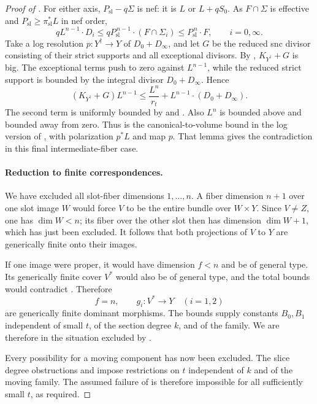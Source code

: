 \begin{proof}[Proof of ]
For either axis, \(P_{\mathrm{sl}}-q\Sigma\) is nef: it is \(L\)
or \(L+qS_0\). As \(F\cap\Sigma\) is effective and
\(P_{\mathrm{sl}}\ge\pi_{\mathrm{sl}}^*L\) in nef order,
\begin{equation}\label{eq:axis-degree-bound}
 qL^{n-1}\cdot D_i
 \le qP_{\mathrm{sl}}^{\,n-1}\cdot(F\cap\Sigma_i)
 \le P_{\mathrm{sl}}^{\,n}\cdot F,\qquad i=0,\infty .
\end{equation}
Take a log resolution \(p:Y^\dagger\to Y\) of \(D_0+D_\infty\),
and let \(G\) be the reduced snc divisor consisting of their strict
supports and all exceptional divisors. By
,
\(K_{Y^\dagger}+G\) is big. The exceptional terms push to zero
against \(L^{n-1}\), while the reduced strict support is bounded
by the integral divisor \(D_0+D_\infty\). Hence
\begin{equation}\label{eq:multisection-log-bound}
 (K_{Y^\dagger}+G)L^{n-1}
 \le \frac{L^n}{r_t}
       +L^{n-1}\cdot(D_0+D_\infty).
\end{equation}
The second term is uniformly bounded by
 and
. Also \(L^n\) is bounded above
and bounded away from zero. Thus
 is the canonical-to-volume bound
in the log version of , with
polarization \(p^*L\) and map \(p\). That lemma gives the
contradiction in this final intermediate-fiber case.

\paragraph{Reduction to finite correspondences.}
We have excluded all slot-fiber dimensions \(1,\ldots,n\).
A fiber dimension \(n+1\) over one slot image \(W\) would force
\(V\) to be the entire bundle over \(W\times Y\).
Since \(V\ne Z\), one has \(\dim W<n\); its fiber over the other
slot then has dimension \(\dim W+1\), which has just been excluded.
It follows that both projections of \(V\) to \(Y\) are generically
finite onto their images.

If one image were proper, it would have dimension \(f<n\) and be of
general type. Its generically finite cover \(V^*\) would also be
of general type, and the total bounds
would contradict . Therefore
\[
 f=n,\qquad g_i:V^*\longrightarrow Y\quad(i=1,2)
\]
are generically finite dominant morphisms. The bounds
supply constants \(B_0,B_1\) independent of small \(t\), of the
section degree \(k\), and of the family. We are therefore in the
situation excluded by .

Every possibility for a moving component has now been excluded.
The slice degree obstructions and
 impose restrictions on \(t\)
independent of \(k\) and of the moving family.
The assumed failure of  is therefore
impossible for all sufficiently small \(t\), as required.
\end{proof}

